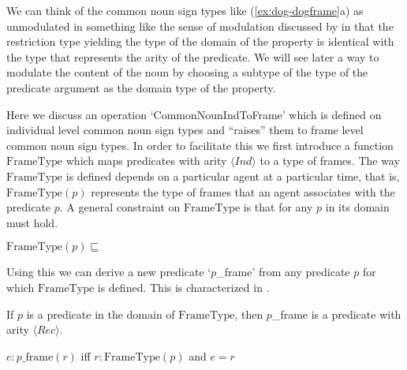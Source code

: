  



We can think of the common noun sign types like (\ref{ex:dog-dogframe}a) as
unmodulated in something like the sense of modulation discussed by
\cite{Recanati2010} in that the restriction type yielding the type of
the domain of the property is identical with the type that represents
the arity of the predicate.  We will see later a way to modulate the content
of the noun by choosing a subtype of the type of the predicate
argument as the domain type of the property. 

Here we discuss an operation `CommonNounIndToFrame' which is defined
on individual level common noun sign types and ``raises'' them to
frame level common noun sign types.  In order to facilitate this we
first introduce a function $\mathrm{FrameType}$ which maps predicates
with arity $\langle\textit{Ind}\rangle$ to a type of frames.  The way
$\mathrm{FrameType}$ is defined depends on a particular agent at a
particular time, that is, $\mathrm{FrameType}(p)$ represents the type
of frames that an agent associates with the predicate $p$.  A general
constraint on $\mathrm{FrameType}$ is that for any $p$ in its domain
\nexteg{} must hold.
\begin{ex} 
  $\mathrm{FrameType}(p)\sqsubseteq$ 
\end{ex} 
Using this we can derive a new predicate `$p$\_frame' from any
predicate $p$ for which $\mathrm{FrameType}$ is defined.  This is
characterized in \nexteg{}.
\begin{ex} 
\begin{subex} 
 
\item If $p$ is a predicate in the domain of $\mathrm{FrameType}$,
  then $p$\_frame is a predicate with arity $\langle\textit{Rec}\rangle$. 
 
\item $e:p\_\text{frame}(r)$ iff $r:\mathrm{FrameType}(p)$ and $e=r$ 
 
\end{subex} 
   
\end{ex} 
  


